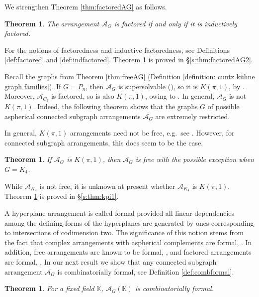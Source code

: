 \documentclass[12pt]{amsart}
\newcommand\CA{{\mathscr A}}
\newcommand\BBK{{\mathbb K}}
\numberwithin{equation}{section}
\theoremstyle{plain}
\newtheorem{theorem}[equation]{Theorem}
\theoremstyle{definition}
\begin{document}
We strengthen Theorem \ref{thm:factoredAG} as follows.

\begin{theorem}
	\label{thm:factoredAG2}
	The arrangement $\CA_G$ is factored if and only if it is inductively factored.
\end{theorem}

For the notions of factoredness and inductive factoredness, see Definitions \ref{def:factored} and \ref{def:indfactored}.
Theorem \ref{thm:factoredAG2} is proved in
\S \ref{s:thm:factoredAG2}.

Recall the graphs from Theorem \ref{thm:freeAG}
(Definition \ref{definition: cuntz kühne graph families}).
If $G = P_n$, then $\CA_G$ is supersolvable (\cite[Thm.~1.8(2)]{cuntzkuehne:subgraphs}), so it is $K(\pi,1)$, by \cite[Prop.~5.12, Thm.~5.113]{orlikterao:arrangements}.
Moreover, $\CA_{C_3}$ is factored, so is also $K(\pi,1)$, owing to \cite{paris:factored}.
In general, $\CA_G$ is not $K(\pi,1)$.
Indeed, the following theorem shows that the graphs $G$ of possible aspherical connected subgraph arrangements $\CA_G$ are extremely restricted.

In general, $K(\pi,1)$ arrangements need not be free, e.g.~see \cite[Fig.~5.4]{orlikterao:arrangements}. However, for connected subgraph arrangements, this does seem to be the case.

\begin{theorem}
	\label{thm:kpi1}
		If $\CA_G$ is $K(\pi,1)$, then $\CA_G$ is free with the possible exception when $G = K_4$.
\end{theorem}

While $\CA_{K_4}$ is not free, it is unknown at present whether $\CA_{K_4}$ is 
$K(\pi,1)$.
Theorem \ref{thm:kpi1} is proved in \S\ref{s:thm:kpi1}.

A hyperplane arrangement is called formal provided all linear dependencies among the defining forms of the hyperplanes are generated by ones corresponding to intersections  of codimension two.
The significance of this notion stems from the fact that
complex arrangements with aspherical complements are formal, \cite[Thm.\ 4.2]{falkrandell:homotopy}.
In addition, free arrangements are known to be formal,
\cite[Cor.~2.5]{yuzvinsky:obstruction},
and factored arrangements are formal, \cite[Thm.~1.1]{moellermueckschroehre:formal}.
In our next result we show that any connected subgraph arrangement $\CA_G$ is combinatorially formal, see Definition \ref{def:combformal}.

\begin{theorem}
	\label{thm:AGformal}
	For a fixed field $\BBK$, $\CA_G(\BBK)$ is combinatorially formal.
\end{theorem}
\end{document}
